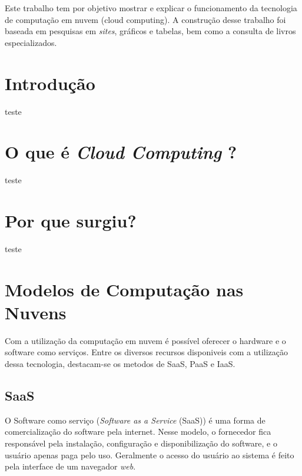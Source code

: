 \documentclass{abnt}
\begin{document}
	\capa
	
	\folhaderosto
	
	\begin{resumo}
		Este trabalho tem por objetivo mostrar e explicar o funcionamento da tecnologia de computação em nuvem (cloud computing). 
		A construção desse trabalho foi baseada em pesquisas em \textit{sites}, gráficos e tabelas, bem como a consulta de livros especializados.
	\end{resumo}
	
	\sumario
	
	\listadetabelas
	
	\listadefiguras
	
	\chapter{Introdução}
		teste
	\chapter{O que é \textit{Cloud Computing} ?}
		teste
	\chapter{Por que surgiu?}
		teste
	\chapter{Modelos de Computação nas Nuvens}

	Com a utilização da computação em nuvem é possível oferecer o 
	hardware e o software como serviços. 
	Entre os diversos recursos disponiveis com a utilização dessa tecnologia, 
	destacam-se os metodos de SaaS, PaaS e IaaS.

	\section{SaaS}
	
	O Software como serviço (\textit{Software as a Service} (SaaS)) é uma forma 
	de comercialização do software pela internet. Nesse modelo, o fornecedor 
	fica responsável pela instalação, configuração e disponibilização do 
	software, e o usuário apenas paga pelo uso.
	Geralmente o acesso do usuário ao sistema é feito pela interface 
	de um navegador \textit{web}.
\end{document}

